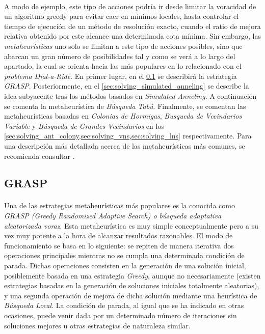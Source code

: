 \documentclass{subfiles}
\begin{document}
      \paragraph{}
      A modo de ejemplo, este tipo de acciones podría ir desde limitar la voracidad de un algoritmo greedy para evitar caer en mínimos locales, hasta controlar el tiempo de ejecución de un método de resolución exacto, cuando el ratio de mejora relativa obtenido por este alcance una determinada cota mínima. Sin embargo, las \emph{metaheurísticas} uno solo se limitan a este tipo de acciones posibles, sino que abarcan un gran número de posibilidades tal y como se verá a lo largo del apartado, la cual se orienta hacia las más populares en lo relacionado con el \emph{problema Dial-a-Ride}. En primer lugar, en el \cref{sec:solving_grasp} se describirá la estrategia \emph{GRASP}. Posteriormente, en el \cref{sec:solving_simulated_anneling} se describe la idea subyacente tras los métodos basados en \emph{Simulated Anneling}. A continuación se comenta la metaheurística de \emph{Búsqueda Tabú}. Finalmente, se comentan las metaheurísticas basadas en \emph{Colonias de Hormigas}, \emph{Busqueda de Vecindarios Variable} y \emph{Búsqueda de Grandes Vecindarios} en los \cref{sec:solving_ant_colony,sec:solving_vns,sec:solving_lns} respectivamente. Para una descripción más detallada acerca de las metaheurísticas más comunes, se recomienda consultar \cite{boussaid2013survey}.

      \subsection{GRASP}
      \label{sec:solving_grasp}

        \paragraph{}
        Una de las estrategias metaheurísticas más populares es la conocida como \emph{GRASP (Greedy Randomized Adaptive Search) o búsqueda adaptativa aleatorizada voraz}. Esta metaheurística es muy simple conceptualmente pero a su vez muy potente a la hora de alcanzar resultados razonables. El modo de funcionamiento se basa en lo siguiente: se repiten de manera iterativa dos operaciones principales mientras no se cumpla una determinada condición de parada. Dichas operaciones consisten en la generación de una solución inicial, posiblemente basada en una estrategia \emph{Greedy}, aunque no necesariamente (existen estrategias basadas en la generación de soluciones iniciales totalmente aleatorias), y una segunda operación de mejora de dicha solución mediante una heurística de \emph{Búsqueda Local}. La condición de parada, al igual que se ha indicado en otras ocasiones, puede venir dada por un determinado número de iteraciones sin soluciones mejores u otras estrategias de naturaleza similar.
\end{document}
